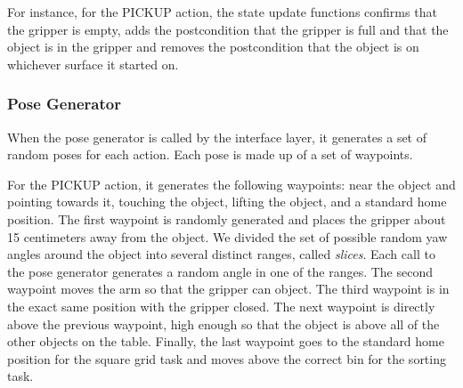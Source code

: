 \documentclass[12pt]{article}
\begin{document}
For instance, for the PICKUP action, the state update functions confirms that the gripper is empty, adds the postcondition that the gripper is full and that the object is in the gripper and removes the postcondition that the object is on whichever surface it started on.


\subsubsection{Pose Generator}

When the pose generator is called by the interface layer, it generates a set of random poses for each action. 
Each pose is made up of a set of waypoints. 

For the PICKUP action, it generates the following waypoints: near the object and pointing towards it, touching the object, lifting the object, and a standard home position. 
The first waypoint is randomly generated and places the gripper about 15 centimeters away from the object.
We divided the set of possible random yaw angles around the object into several distinct ranges, called \textit{slices}. 
Each call to the pose generator generates a random angle in one of the ranges.
The second waypoint moves the arm so that the gripper can object. 
The third waypoint is in the exact same position with the gripper closed. 
The next waypoint is directly above the previous waypoint, high enough so that the object is above all of the other objects on the table. 
Finally, the last waypoint goes to the standard home position for the square grid task and moves  above the correct bin for the sorting task.
\end{document}
